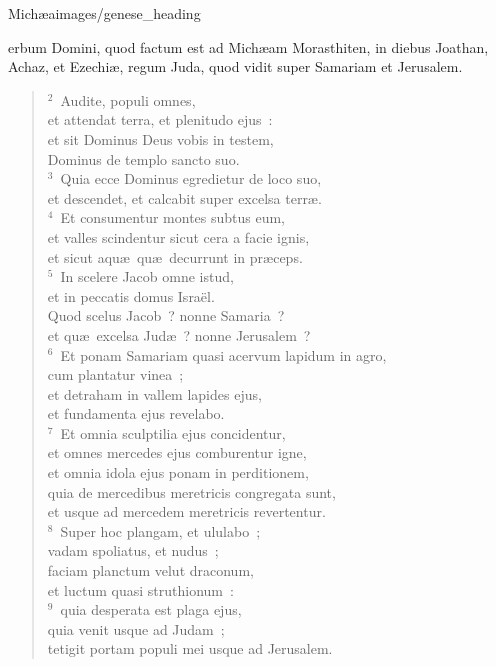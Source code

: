 {Michæa}{images/genese_heading}


\bchapter
{}erbum Domini, quod factum est ad Mich\ae am Morasthiten, in diebus Joathan, Achaz, et Ezechi\ae , regum Juda, quod vidit super Samariam et Jerusalem.


\begin{verse}${}^{2}$~Audite, populi omnes,\\ et attendat terra, et plenitudo ejus~:\\ et sit Dominus Deus vobis in testem,\\ Dominus de templo sancto suo.\\
${}^{3}$~Quia ecce Dominus egredietur de loco suo,\\ et descendet, et calcabit super excelsa terr\ae .\\
${}^{4}$~Et consumentur montes subtus eum,\\ et valles scindentur sicut cera a facie ignis,\\ et sicut aqu\ae\ qu\ae\ decurrunt in pr\ae ceps.\\
${}^{5}$~In scelere Jacob omne istud,\\ et in peccatis domus Isra\"el.\\ Quod scelus Jacob~? nonne Samaria~?\\ et qu\ae\ excelsa Jud\ae~? nonne Jerusalem~?\\
${}^{6}$~Et ponam Samariam quasi acervum lapidum in agro,\\ cum plantatur vinea~;\\ et detraham in vallem lapides ejus,\\ et fundamenta ejus revelabo.\\
${}^{7}$~Et omnia sculptilia ejus concidentur,\\ et omnes mercedes ejus comburentur igne,\\ et omnia idola ejus ponam in perditionem,\\ quia de mercedibus meretricis congregata sunt,\\ et usque ad mercedem meretricis revertentur.\\
${}^{8}$~Super hoc plangam, et ululabo~;\\ vadam spoliatus, et nudus~;\\ faciam planctum velut draconum,\\ et luctum quasi struthionum~:\\
${}^{9}$~quia desperata est plaga ejus,\\ quia venit usque ad Judam~;\\ tetigit portam populi mei usque ad Jerusalem.\\

\end{verse}

